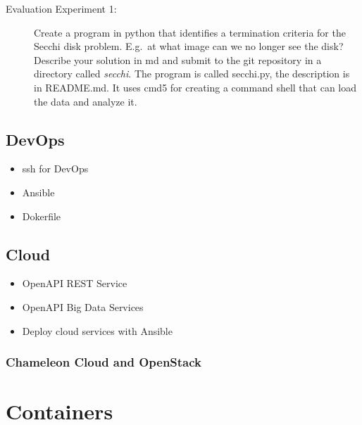 \begin{description}
\item[Evaluation Experiment 1:] Create a program in python that
  identifies a termination criteria for the Secchi disk
  problem. E.g.\ at what image can we no longer see the disk?
  Describe your solution in md and submit to the git repository in a
  directory called \textit{secchi}. The program is called secchi.py, the
  description is in README.md. It uses cmd5 for creating a command
  shell that can load the data and analyze it. 
\end{description}

\subsection{DevOps}

\begin{itemize}
\item ssh for DevOps
\item Ansible
\item Dokerfile
\end{itemize}

\subsection{Cloud}


\begin{itemize}
\item OpenAPI REST Service
\item OpenAPI Big Data Services
\item Deploy cloud services with Ansible
\end{itemize}

\subsubsection{Chameleon Cloud and OpenStack}



\section{Containers}

